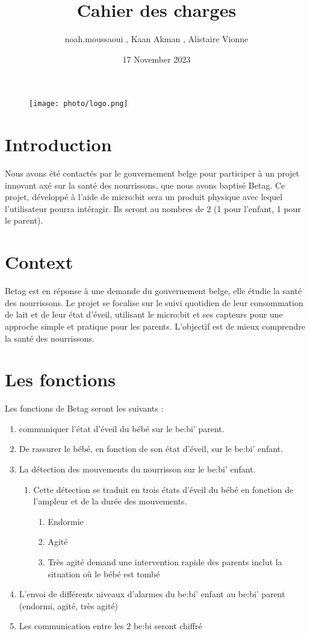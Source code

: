 \documentclass{article}
\title{Cahier des charges}
\author{noah.moussaoui , Kaan Akman , Alistaire Vionne }
\date{ 17 November 2023}
\begin{document}
\maketitle

\begin{figure}[h]
    \centering
    \texttt{[image: photo/logo.png]}
    \label{ucl}
\end{figure}

\section{Introduction}
Nous avons été contactés par le gouvernement belge pour participer à un projet innovant axé sur la santé des nourrissons, que nous avons baptisé Betag. Ce projet, développé à l'aide de micro:bit sera un produit physique avec lequel l'utilisateur pourra intéragir. Ils seront au nombres de 2 (1 pour l'enfant, 1 pour le parent).

\section{Context}
Betag est en réponse à une demande du gouvernement belge, elle étudie la santé des nourrissons. Le projet se focalise sur le suivi quotidien de leur consommation de lait et de leur état d'éveil, utilisant le micro:bit et ses capteurs pour une approche simple et pratique pour les parents. L'objectif est de mieux comprendre la santé des nourrissons.

\section{Les fonctions}
Les fonctions de Betag seront les suivants :
\begin{enumerate}
    \item communiquer l’état d’éveil du bébé sur le be:bi’ parent.
    \item De rassurer le bébé, en fonction de son état d’éveil, sur le be:bi’ enfant.
    \item La détection des mouvements du nourrisson sur le be:bi’ enfant.
    \begin{enumerate}
        \item Cette détection se traduit en trois états d’éveil du bébé en fonction de l’ampleur et de la durée des mouvements.
        \begin{enumerate}
            \item  Endormie
            \item  Agité
            \item Très agité demand une intervention rapide des parents inclut la situation où le bébé est tombé
        \end{enumerate}
    \end{enumerate}
        \item L’envoi de différents niveaux d’alarmes du be:bi’ enfant au be:bi’ parent (endormi, agité, très agité) 
        \item Les communication entre les 2 be:bi seront chiffré
    
\end{enumerate}
\end{document}

